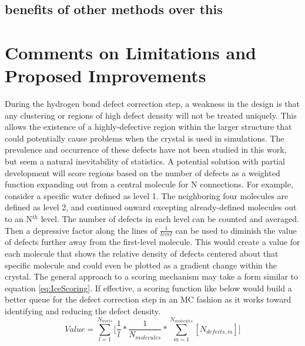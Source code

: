 \subsection{benefits of other methods over this}
%
%
%
%


\section{Comments on Limitations and Proposed Improvements}

During the hydrogen bond defect correction step, a weakness in the design is that any clustering or regions of high defect density will not be treated uniquely.
This allows the existence of a highly-defective region within the larger structure that could potentially cause problems when the crystal is used in simulations. 
The prevalence and occurrence of these defects have not been studied in this work, but seem a natural inevitability of statistics. 
A potential solution with partial development will score regions based on the number of defects as a weighted function expanding out from a central molecule for N connections. 
For example, consider a specific water defined as level 1. 
The neighboring four molecules are defined as level 2, and continued onward excepting already-defined molecules out to an N$^{th}$ level. 
The number of defects in each level can be counted and averaged.
Then a depressive factor along the lines of $\frac{1}{level}$ can be used to diminish the value of defects further away from the first-level molecule.
This would create a value for each molecule that shows the relative density of defects centered about that specific molecule and could even be plotted as a gradient change within the crystal.
The general approach to a scoring mechanism may take a form similar to equation \ref{eq:IceScoring}.
If effective, a scoring function like below would build a better queue for the defect correction step in an MC fashion as it works toward identifying and reducing the defect density.
\begin{equation}
\label{eq:IceScoring}
Value = \sum_{l=1}^{N_{levels}} \Big[\frac{1}{l} * \frac{1} {N_{molecules}} *\sum_{m=1}^{N_{molecules}}[N_{defects, m}]\Big]
\end{equation}





